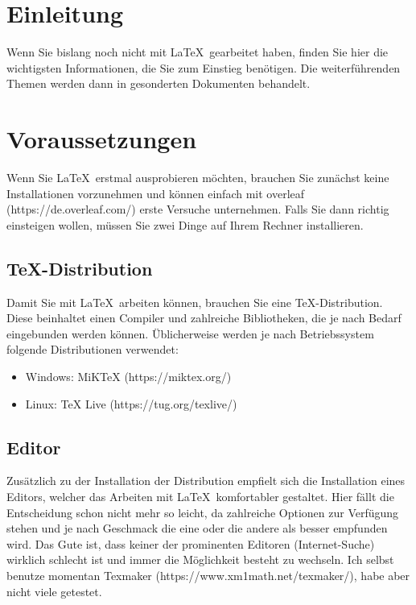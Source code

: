 \documentclass[12pt,a4paper]{scrartcl}
\begin{document}
%
\section{Einleitung}
%
Wenn Sie bislang noch nicht mit \LaTeX\, gearbeitet haben, finden Sie hier die wichtigsten Informationen, die Sie zum Einstieg benötigen.
Die weiterführenden Themen werden dann in gesonderten Dokumenten behandelt. 
%
\section{Voraussetzungen}
%
Wenn Sie \LaTeX\, erstmal ausprobieren möchten, brauchen Sie zunächst keine Installationen vorzunehmen und können einfach mit overleaf (https://de.overleaf.com/) erste Versuche unternehmen.
Falls Sie dann richtig einsteigen wollen, müssen Sie zwei Dinge auf Ihrem Rechner installieren.
%
\subsection{TeX-Distribution}
%
Damit Sie mit \LaTeX\, arbeiten können, brauchen Sie eine TeX-Distribution.
Diese beinhaltet einen Compiler und zahlreiche Bibliotheken, die je nach Bedarf eingebunden werden können.
Üblicherweise werden je nach Betriebssystem folgende Distributionen verwendet:
%
\begin{itemize}
\item Windows: MiKTeX (https://miktex.org/)
\item Linux: TeX Live (https://tug.org/texlive/)
\end{itemize}
%
\subsection{Editor}
%
Zusätzlich zu der Installation der Distribution empfielt sich die Installation eines Editors, welcher das Arbeiten mit \LaTeX\, komfortabler gestaltet. 
Hier fällt die Entscheidung schon nicht mehr so leicht, da zahlreiche Optionen zur Verfügung stehen und je nach Geschmack die eine oder die andere als besser empfunden wird.
Das Gute ist, dass keiner der prominenten Editoren (Internet-Suche) wirklich schlecht ist und immer die Möglichkeit besteht zu wechseln.
Ich selbst benutze momentan Texmaker (https://www.xm1math.net/texmaker/), habe aber nicht viele getestet.
%
\end{document}
